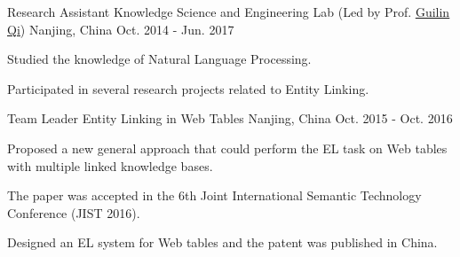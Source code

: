 

\begin{cventries}

  \cventry
    {Research Assistant} %
    {Knowledge Science and Engineering Lab (Led by Prof. \href{http://cse.seu.edu.cn/people/qgl/index.htm}{\underline{Guilin Qi}})} %
    {Nanjing, China} %
    {Oct. 2014 - Jun. 2017} %
    {
      \begin{cvitems} %
        \item {Studied the knowledge of Natural Language Processing.}
        \item {Participated in several research projects related to Entity Linking.}
      \end{cvitems}
    }

  \cventry
    {Team Leader} %
    {Entity Linking in Web Tables} %
    {Nanjing, China} %
    {Oct. 2015 - Oct. 2016} %
    {
      \begin{cvitems} %
        \item {Proposed a new general approach that could perform the EL task on Web tables with multiple linked knowledge bases.}
        \item {The paper was accepted in the 6th Joint International Semantic Technology Conference (JIST 2016).}
        \item {Designed an EL system for Web tables and the patent was published in China.}
      \end{cvitems}
    }


\end{cventries}
